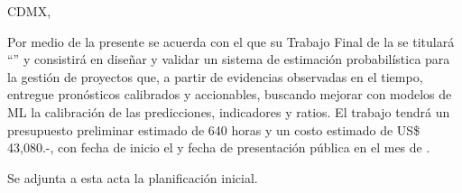 \documentclass[12pt]
{charter}
\begin{document}
\begin{flushright}
CDMX, \fechaInicioName
\end{flushright}

\vspace{2cm}

Por medio de la presente se acuerda con el \authorname\hspace{1px} que su Trabajo Final de la \degreename\hspace{1px} se titulará ``\ttitle'' y consistirá en diseñar y validar un sistema de estimación probabilística para la gestión de proyectos que, a partir de evidencias observadas en el tiempo, entregue pronósticos calibrados y accionables, buscando mejorar con modelos de ML la calibración de las predicciones, indicadores y ratios. El trabajo tendrá un presupuesto preliminar estimado de 640 horas y un costo estimado de US\$ 43,080.-, con fecha de inicio el \fechaInicioName\hspace{1px} y fecha de presentación pública en el mes de {\fechaFinalName}.

Se adjunta a esta acta la planificación inicial.

\vfill

\end{document}
